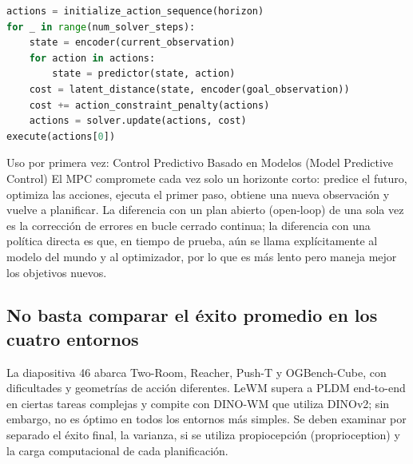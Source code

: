 \begin{lstlisting}[language=Python,caption={Ciclo mínimo de predicción-optimización del Latent MPC}]
actions = initialize_action_sequence(horizon)
for _ in range(num_solver_steps):
    state = encoder(current_observation)
    for action in actions:
        state = predictor(state, action)
    cost = latent_distance(state, encoder(goal_observation))
    cost += action_constraint_penalty(actions)
    actions = solver.update(actions, cost)
execute(actions[0])
\end{lstlisting}


\begin{knowledgebox}{Uso por primera vez: Control Predictivo Basado en Modelos (Model Predictive Control)}
El MPC compromete cada vez solo un horizonte corto: predice el futuro, optimiza las acciones, ejecuta el primer paso, obtiene una nueva observación y vuelve a planificar. La diferencia con un plan abierto (open-loop) de una sola vez es la corrección de errores en bucle cerrado continua; la diferencia con una política directa es que, en tiempo de prueba, aún se llama explícitamente al modelo del mundo y al optimizador, por lo que es más lento pero maneja mejor los objetivos nuevos.
\end{knowledgebox}

\subsection{No basta comparar el éxito promedio en los cuatro entornos}

La diapositiva 46 abarca Two-Room, Reacher, Push-T y OGBench-Cube, con dificultades y geometrías de acción diferentes. LeWM supera a PLDM end-to-end en ciertas tareas complejas y compite con DINO-WM que utiliza DINOv2; sin embargo, no es óptimo en todos los entornos más simples. Se deben examinar por separado el éxito final, la varianza, si se utiliza propiocepción (proprioception) y la carga computacional de cada planificación.



